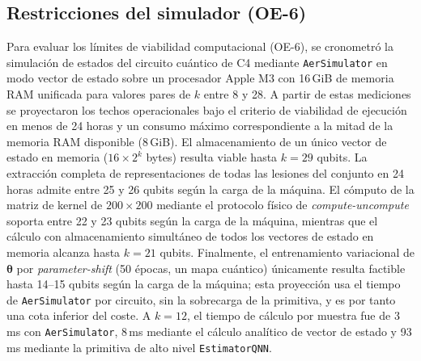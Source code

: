 
\subsection{Restricciones del simulador (OE-6)}
\label{sec:restricciones_simulador}

Para evaluar los límites de viabilidad computacional (OE-6), se cronometró la simulación de estados del circuito cuántico de C4 mediante \texttt{AerSimulator} en modo vector de estado sobre un procesador Apple M3 con 16\,GiB de memoria RAM unificada para valores pares de $k$ entre 8 y 28. A partir de estas mediciones se proyectaron los techos operacionales bajo el criterio de viabilidad de ejecución en menos de 24 horas y un consumo máximo correspondiente a la mitad de la memoria RAM disponible (8\,GiB). El almacenamiento de un único vector de estado en memoria ($16 \times 2^k$ bytes) resulta viable hasta $k = 29$ qubits. La extracción completa de representaciones de todas las lesiones del conjunto en 24 horas admite entre 25 y 26 qubits según la carga de la máquina. El cómputo de la matriz de kernel de $200 \times 200$ mediante el protocolo físico de \textit{compute-uncompute} soporta entre 22 y 23 qubits según la carga de la máquina, mientras que el cálculo con almacenamiento simultáneo de todos los vectores de estado en memoria alcanza hasta $k = 21$ qubits. Finalmente, el entrenamiento variacional de $\boldsymbol\theta$ por \textit{parameter-shift} (50 épocas, un mapa cuántico) únicamente resulta factible hasta 14--15 qubits según la carga de la máquina; esta proyección usa el tiempo de \texttt{AerSimulator} por circuito, sin la sobrecarga de la primitiva, y es por tanto una cota inferior del coste. A $k = 12$, el tiempo de cálculo por muestra fue de 3\,ms con \texttt{AerSimulator}, 8\,ms mediante el cálculo analítico de vector de estado y 93\,ms mediante la primitiva de alto nivel \texttt{EstimatorQNN}.

